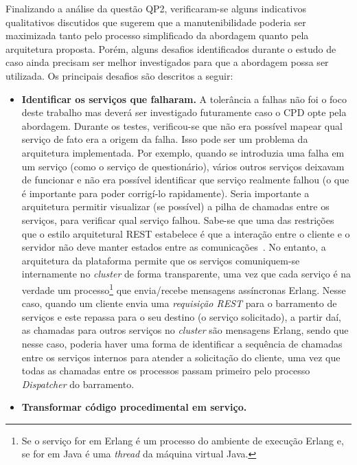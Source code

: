 Finalizando a análise da questão QP2, verificaram-se alguns indicativos
qualitativos discutidos que sugerem que a manutenibilidade poderia ser maximizada tanto
pelo processo simplificado da abordagem quanto pela arquitetura
proposta. Porém, alguns desafios identificados durante o estudo de caso
ainda precisam ser melhor investigados para que a abordagem possa ser utilizada. Os 
principais desafios são descritos a seguir:

\begin{itemize}

	\item \textbf{Identificar os serviços que falharam.} A tolerância a falhas não foi o foco deste trabalho mas deverá ser investigado futuramente caso o \acrshort{CPD} opte pela abordagem. Durante os testes, verificou-se que não era possível mapear qual serviço de fato era a origem da falha. Isso pode ser um problema da arquitetura implementada. Por exemplo, quando se introduzia uma falha em um serviço (como o serviço de questionário), vários outros serviços deixavam de funcionar e não era possível identificar que serviço realmente falhou (o que é importante para poder corrigí-lo rapidamente). Seria importante a arquitetura permitir visualizar (se possível) a pilha de chamadas entre os serviços, para verificar qual serviço falhou. Sabe-se que uma das restrições que 
o estilo arquitetural \acrshort{REST} estabelece é que a interação entre 
o cliente e o servidor não deve manter estados entre as comunicações~\cite{fielding2000architectural}. No entanto, a arquitetura da plataforma permite que os serviços comuniquem-se internamente no \textit{cluster} de forma transparente, uma vez que cada serviço é na verdade um processo\footnote{Se o serviço for em Erlang é um processo do ambiente de execução Erlang e, se for em Java é uma \textit{thread} da máquina virtual Java.} que envia/recebe mensagens assíncronas Erlang. Nesse caso, quando um cliente envia uma \emph{requisição REST} para o barramento de serviços e este repassa para o seu destino (o serviço solicitado), a partir daí, as chamadas para outros serviços 
no \textit{cluster} são mensagens Erlang, sendo que nesse caso, poderia haver uma forma de identificar a sequência de chamadas entre os serviços internos para atender a solicitação do cliente, uma vez que todas as chamadas entre os processos passam primeiro pelo processo \emph{Dispatcher} do barramento. 

	\item \textbf{Transformar código procedimental em serviço.}


\end{itemize}
